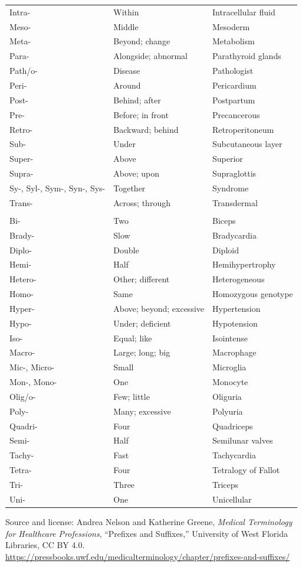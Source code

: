 \begin{longtable}{>{\raggedright\arraybackslash}p{} >{\raggedright\arraybackslash}p{} >{\raggedright\arraybackslash}p{}}
Intra- & Within & Intracellular fluid \\
Meso- & Middle & Mesoderm \\
Meta- & Beyond; change & Metabolism \\
Para- & Alongside; abnormal & Parathyroid glands \\
Path/o- & Disease & Pathologist \\
Peri- & Around & Pericardium \\
Post- & Behind; after & Postpartum \\
Pre- & Before; in front & Precancerous \\
Retro- & Backward; behind & Retroperitoneum \\
Sub- & Under & Subcutaneous layer \\
Super- & Above & Superior \\
Supra- & Above; upon & Supraglottis \\
Sy-, Syl-, Sym-, Syn-, Sys- & Together & Syndrome \\
Trans- & Across; through & Transdermal \\
\midrule
\multicolumn{3}{l}{\textbf{Quantity prefixes}} \\
Bi- & Two & Biceps \\
Brady- & Slow & Bradycardia \\
Diplo- & Double & Diploid \\
Hemi- & Half & Hemihypertrophy \\
Hetero- & Other; different & Heterogeneous \\
Homo- & Same & Homozygous genotype \\
Hyper- & Above; beyond; excessive & Hypertension \\
Hypo- & Under; deficient & Hypotension \\
Iso- & Equal; like & Isointense \\
Macro- & Large; long; big & Macrophage \\
Mic-, Micro- & Small & Microglia \\
Mon-, Mono- & One & Monocyte \\
Olig/o- & Few; little & Oliguria \\
Poly- & Many; excessive & Polyuria \\
Quadri- & Four & Quadriceps \\
Semi- & Half & Semilunar valves \\
Tachy- & Fast & Tachycardia \\
Tetra- & Four & Tetralogy of Fallot \\
Tri- & Three & Triceps \\
Uni- & One & Unicellular \\
\bottomrule
\end{longtable}

\noindent Source and license: Andrea Nelson and Katherine Greene, \textit{Medical Terminology for Healthcare Professions}, ``Prefixes and Suffixes,'' University of West Florida Libraries, CC BY 4.0. \url{https://pressbooks.uwf.edu/medicalterminology/chapter/prefixes-and-suffixes/}
